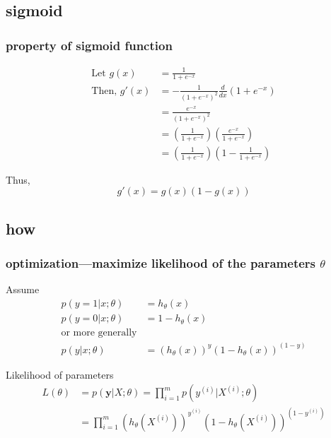 \documentclass[11pt]{beamer}
\begin{document}
\subsection{sigmoid}
\begin{frame}
	\frametitle{property of sigmoid function}
	\begin{align*}
	\textrm{Let } g(x) &= \frac{1}{1+e^{-x}} \\
	\textrm{Then, } g'(x) &= -\frac{1}{(1+e^{-x})^2}\frac{d}{dx}(1+e^{-x})\\
		 &= \frac{e^{-x}}{(1+e^{-x})^2} \\
		&= \left(\frac{1}{1+e^{-x}}\right) \left(\frac{e^{-x}}{1+e^{-x}}\right) \\
		&= \left(\frac{1}{1+e^{-x}}\right) \left(1 - \frac{1}{1+e^{-x}}\right) 
	\end{align*}
\vspace{-10pt}
	\begin{block}{Thus,}
	\begin{equation}
	\label{eq:sigmoid_derivative}
	g'(x) = g(x) (1-g(x))
	\end{equation}
	\end{block}
\end{frame}

\subsection{how}
\begin{frame}
	\frametitle{optimization---maximize likelihood of the parameters $\theta$}
		Assume  
		\begin{align*}
		p(y=1|x; \theta) &= h_\theta(x)\\
		p(y=0|x; \theta) &= 1-h_\theta(x) \\
		\textrm{or more generally}\\
		p(y|x; \theta) &= (h_\theta(x))^y (1-h_\theta(x))^{(1-y)}
		\end{align*}

		\begin{block}{Likelihood of parameters}
		\begin{align*}
			L(\theta) &= p(\mathbf{y} | X; \theta) = \prod_{i=1}^{m} p(y^{(i)} | X^{(i)}; \theta) \\
					 &= \prod_{i=1}^{m} (h_\theta(X^{(i)}))^{y^{(i)}} (1-h_\theta(X^{(i)}))^{(1-y^{(i)})}
		\end{align*}
		\end{block}
\end{frame}
\end{document}
